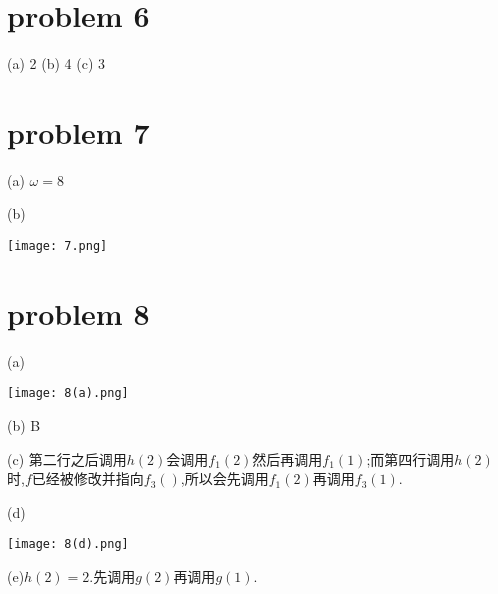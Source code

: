 \documentclass[4paper,10pt]{paper}
\begin{document}
\section*{problem 6}
(a) 2 (b) 4 (c) 3

\section*{problem 7}

(a) $\omega=8$

(b)
\begin{center}
\texttt{[image: 7.png]}
\end{center}

\pagebreak
\section*{problem 8}
(a)
\begin{center}
\texttt{[image: 8(a).png]}
\end{center}

(b) B

(c) 第二行之后调用$h(2)$会调用$f_{1}(2)$然后再调用$f_{1}(1)$;而第四行调用$h(2)$时,$f$已经被修改并指向$f_{3}()$,所以会先调用$f_{1}(2)$再调用$f_{3}(1)$.

\pagebreak
(d)\\
\begin{center}
\texttt{[image: 8(d).png]}
\end{center}

(e)$h(2)=2$.先调用$g(2)$再调用$g(1)$.
\end{document}
